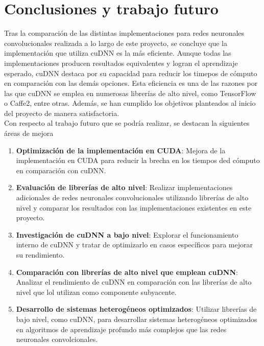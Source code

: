 \chapter{Conclusiones y trabajo futuro}

Tras la comparación de las distintas implementaciones para redes neuronales convolucionales realizada a lo largo de este proyecto, se concluye que la implementación que utiliza cuDNN es la más eficiente. Aunque todas las implementaciones producen resultados equivalentes y logran el aprendizaje esperado, cuDNN destaca por su capacidad para reducir los timepos de cómputo en comparación con las demás opciones. Esta eficiencia es una de las razones por las que cuDNN se emplea en numerosas librerías de alto nivel, como TensorFlow o Caffe2, entre otras. Además, se han cumplido los objetivos planteados al inicio del proyecto de manera satisfactoria. \\
Con respecto al trabajo futuro que se podría realizar, se destacan la siguientes áreas de mejora
\begin{enumerate}[label=\textbullet]
	\item \textbf{Optimización de la implementación en CUDA}: Mejora de la implementación en CUDA para reducir la brecha en los tiempos ded cómputo en comparación con cuDNN.
	\item \textbf{Evaluación de librerías de alto nivel}: Realizar implementaciones adicionales de redes neuronales convolucionales utilizando librerías de alto nivel y comparar los resultados con las implementaciones existentes en este proyecto.
	\item \textbf{Investigación de cuDNN a bajo nivel}: Explorar el funcionamiento interno de cuDNN y tratar de optimizarlo en casos específicos para mejorar su rendimiento.
	\item \textbf{Comparación con librerías de alto nivel que emplean cuDNN}: Analizar el rendimiento de cuDNN en comparación con las librerías de alto nivel que lol utilizan como componente subyacente.
	\item \textbf{Desarrollo de sistemas heterogéneos optimizados}: Utilizar librerías de bajo nivel, como cuDNN, para desarrollar sistemas heterogéneos optimizados en algoritmos de aprendizaje profundo más complejos que las redes neuronales convolcionales.  
\end{enumerate}